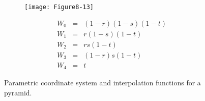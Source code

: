 \begin{figure}[!htb]
	\centering
	\begin{subfigure}{0.48\linewidth}
		\centering
		\texttt{[image: Figure8-13]}
		\caption*{}
	\end{subfigure}
	\hfill
	\begin{subfigure}{0.48\linewidth}
		\centering
		\begin{equation*}
		\begin{array}{lll}
		W_0 &=& (1-r)(1-s)(1-t) \\
		W_1 &=& r(1-s)(1-t) \\
		W_2 &=& r s (1-t) \\
		W_3 &=& (1-r)s(1-t) \\
		W_4 &=& t	
		\end{array}
		\end{equation*}
	\end{subfigure}%
	\caption{Parametric coordinate system and interpolation functions for a pyramid.}
	\label{fig:Figure8-13}
\end{figure}

